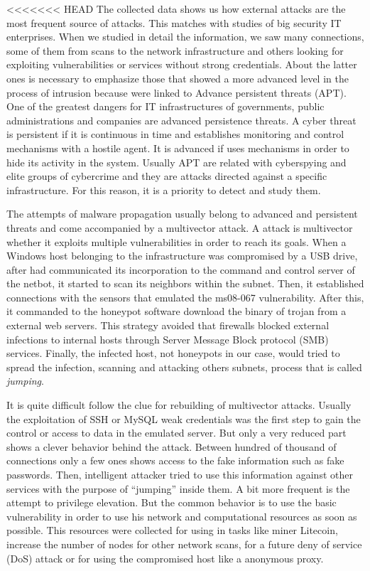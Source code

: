 \documentclass[a4paper]{llncs}
\begin{document}
<<<<<<< HEAD
The collected data shows us how external attacks are the most frequent source of attacks. This matches with studies of big security IT enterprises\cite{verizon-2015}. When we studied in detail the information, we saw many connections, some of them from scans to the network infrastructure and others looking for exploiting vulnerabilities or services without strong credentials. About the latter ones is necessary to emphasize those that showed a more advanced level in the process of intrusion because were linked to Advance persistent threats (APT). One of the greatest dangers for IT infrastructures of governments, public administrations and companies are advanced persistence threats. A cyber threat is persistent if it is continuous in time and establishes monitoring and control mechanisms with a hostile agent. It is advanced if uses mechanisms in order to hide its activity in the system. Usually APT are related with cyberspying and elite groups of cybercrime and they are attacks directed against a specific infrastructure. For this reason, it is a priority to detect and study them.

The attempts of malware propagation usually belong to advanced and persistent threats and come accompanied by a multivector attack. A attack is multivector whether it exploits multiple vulnerabilities in order to reach its goals. When a Windows host belonging to the infrastructure was compromised by a USB drive, after had communicated its incorporation to the command and control server of the netbot, it started to scan its neighbors within the subnet. Then, it established connections with the sensors that  emulated the ms08-067\cite{ms08067} vulnerability. After this, it commanded to the honeypot software download the binary of trojan from a external web servers. This strategy avoided that firewalls blocked external infections to internal hosts through Server Message Block protocol (SMB) services. Finally, the infected host, not honeypots in our case, would tried to spread the infection, scanning and attacking others subnets, process that is called {\it jumping}.

It is quite difficult follow the clue for rebuilding of multivector attacks. Usually the exploitation of SSH or MySQL weak credentials was the first step to gain the control or access to data in the emulated server. But only a very reduced part shows a clever behavior behind the attack. Between hundred of thousand of connections only a few ones shows access to the fake information such as fake passwords. Then, intelligent attacker tried to use this information against other services with the purpose of  ``jumping'' inside them. A bit more frequent is the attempt to privilege elevation. But the common behavior is to use the basic vulnerability in order to use his network and computational resources as soon as possible. This resources were collected for using in tasks like miner Litecoin\cite{litecoin}, increase the number of nodes for other network scans, for a future deny of service (DoS) attack or for using the compromised host like a anonymous proxy.
\end{document}
